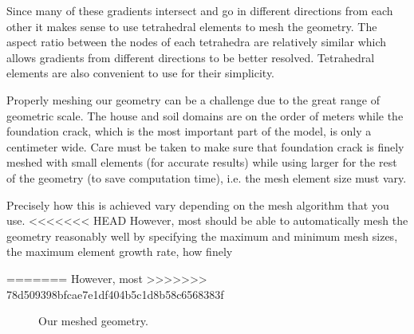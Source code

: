 Since many of these gradients intersect and go in different directions from each other it makes sense to use tetrahedral elements to mesh the geometry.
The aspect ratio between the nodes of each tetrahedra are relatively similar which allows gradients from different directions to be better resolved.
Tetrahedral elements are also convenient to use for their simplicity.\par

Properly meshing our geometry can be a challenge due to the great range of geometric scale.
The house and soil domains are on the order of meters while the foundation crack, which is the most important part of the model, is only a centimeter wide.
Care must be taken to make sure that foundation crack is finely meshed with small elements (for accurate results) while using larger for the rest of the geometry (to save computation time), i.e. the mesh element size must vary.\par

Precisely how this is achieved vary depending on the mesh algorithm that you use.
<<<<<<< HEAD
However, most should be able to automatically mesh the geometry reasonably well by specifying the maximum and minimum mesh sizes, the maximum element growth rate, how finely

=======
However, most
>>>>>>> 78d509398bfcae7e1df404b5c1d8b58c6568383f

\begin{figure}[htb!]
  \caption{Our meshed geometry.}
  \label{fig:meshed_geometry}
\end{figure}
